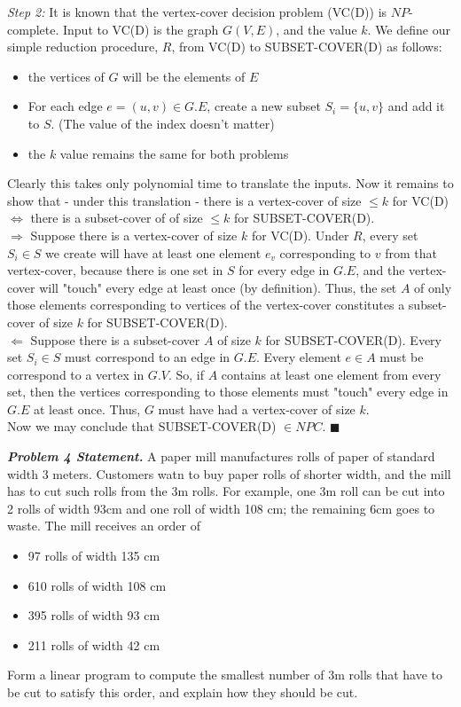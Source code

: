 \documentclass[10pt, letterpaper, twosided]{article}
\begin{document}
\textit{Step 2:}
It is known that the vertex-cover decision problem (VC(D)) is $NP$-complete. Input to VC(D) is the graph $G(V,E)$,
and the value $k$. We define our simple reduction procedure, $R$, from VC(D) to SUBSET-COVER(D) as follows:
\begin{itemize}
\item the vertices of $G$ will be the elements of $E$
\item For each edge $e=(u,v) \in G.E$, create a new subset $S_i = \{u, v\}$ and add it to $S$. (The value of the index doesn't matter)
\item the $k$ value remains the same for both problems
\end{itemize}
Clearly this takes only polynomial time to translate the inputs.  Now it remains to show that - under this translation - 
there is a vertex-cover of size $\leq k$ for VC(D) $\iff$ there is a subset-cover of of size $\leq k$ 
for SUBSET-COVER(D).\\

$\Longrightarrow$ Suppose there is a vertex-cover of size $k$ for VC(D).  Under $R$, every set $S_i \in S$ we create
will have at least one element $e_v$ corresponding to $v$ from that vertex-cover, because there is one set in $S$ for every edge in $G.E$, and the vertex-cover will "touch" every edge at least once (by definition).   Thus, the set $A$ of only those elements corresponding to vertices of the vertex-cover constitutes a subset-cover of size $k$ for SUBSET-COVER(D).\\

$\Longleftarrow$ Suppose there is a subset-cover $A$ of size $k$ for SUBSET-COVER(D).  Every set $S_i \in S$ must 
correspond to an edge in $G.E$.  Every element $e \in A$ must be correspond to a vertex in $G.V$.  So, if $A$ contains at 
least one element from every set, then the vertices corresponding to those elements must "touch" every edge in $G.E$ 
at least once.  Thus, $G$ must have had a vertex-cover of size $k$.\\

Now we may conclude that SUBSET-COVER(D) $\in NPC$. $\blacksquare$\\

\newpage

\emph{\textbf{Problem 4 Statement.}} A paper mill manufactures rolls of paper of standard width 3 meters.  Customers
watn to buy paper rolls of shorter width, and the mill has to cut such rolls from the 3m rolls.  For example, one 3m roll
can be cut into 2 rolls of width 93cm and one roll of width 108 cm; the remaining 6cm goes to waste.  The mill receives 
an order of
\begin{itemize}
\item 97 rolls of width 135 cm
\item 610 rolls of width 108 cm
\item 395 rolls of width 93 cm
\item 211 rolls of width 42 cm
\end{itemize}
Form a linear program to compute the smallest number of 3m rolls that have to be cut to satisfy this order, and explain
how they should be cut.\\
\end{document}

